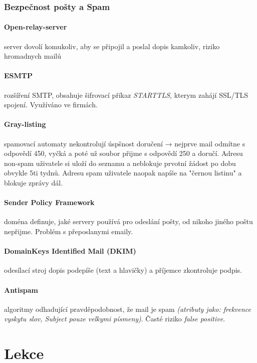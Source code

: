 \documentclass[10pt,a4paper]{article}
\begin{document}
\subsubsection{Bezpečnost pošty a Spam}

\paragraph{Open-relay-server} server dovolí komukoliv, aby se připojil a poslal dopis kamkoliv, riziko hromadnych mailů

\paragraph{ESMTP} rozšíření SMTP, obsahuje šifrovací příkaz \textit{STARTTLS}, kterym zahájí SSL/TLS spojení. Využíváno ve firmách.

\paragraph{Gray-listing} spamovací automaty nekontrolují úspšnost doručení → nejprve mail odmítne s odpovědí 450, vyčká a poté už soubor přijme s odpovědí 250 a doručí. Adresu non-spam uživatele si uloží do seznamu a neblokuje prvotní žádost po dobu obvykle 5ti tydnů. Adresu spam uživatele naopak napíše na "černou listinu" a blokuje zprávy dál.

\paragraph{Sender Policy Framework} doména definuje, jaké servery používá pro odeslání pošty, od nikoho jiného poštu nepřijme. Problém s přeposlanymi emaily.

\paragraph{DomainKeys Identified Mail (DKIM)} odesílací stroj dopis podepíše (text a hlavičky) a příjemce zkontroluje podpis.

\paragraph{Antispam} algoritmy odhadující pravděpodobnost, že mail je spam \textit{(atributy jako: frekvence vyskytu slov, Subject pouze velkymi písmeny)}. Časté riziko \textit{false positive}.

\section{Lekce}
\end{document}
